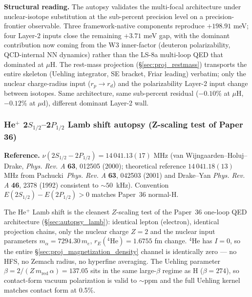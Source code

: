 \documentclass[11pt]{article}
\begin{document}
\textbf{Structural reading.}  The autopsy validates the multi-focal
architecture under nuclear-isotope substitution at the sub-percent
precision level on a precision-frontier observable.  Three
framework-native components reproduce $+198.91$ meV; four Layer-2
inputs close the remaining $+3.71$ meV gap, with the dominant
contribution now coming from the W3 inner-factor (deuteron
polarizability, QCD-internal NN dynamics) rather than the LS-8a
multi-loop QED that dominated at $\mu$H.  The rest-mass projection
(\S\ref{sec:proj_restmass}) transports the entire skeleton (Uehling
integrator, SE bracket, Friar leading) verbatim; only the nuclear
charge-radius input ($r_p \to r_d$) and the polarizability
Layer-2 input change between isotopes.  Same architecture, same
sub-percent residual ($-0.10\%$ at $\mu$H, $-0.12\%$ at $\mu$d),
different dominant Layer-2 wall.

\subsubsection{He$^+$ 2$S_{1/2}$--2$P_{1/2}$ Lamb shift autopsy (Z-scaling test of Paper 36)}
\label{sec:autopsy_he_plus_lamb}

\textbf{Reference.}  $\nu(2S_{1/2} - 2P_{1/2}) = 14\,041.13(17)$ MHz
(van Wijngaarden--Holuj--Drake, \emph{Phys. Rev. A} \textbf{63}, 012505
(2000); theoretical reference $14\,041.18(13)$ MHz from
Pachucki~\emph{Phys. Rev. A} \textbf{63}, 042503 (2001) and Drake--Yan
\emph{Phys. Rev. A} \textbf{46}, 2378 (1992) consistent to $\sim 50$~kHz).
Convention $E(2S_{1/2}) - E(2P_{1/2}) > 0$ matches Paper~36 normal-H.

The He$^+$ Lamb shift is the cleanest $Z$-scaling test of the Paper~36
one-loop QED architecture (\S\ref{sec:autopsy_lamb}): identical lepton
(electron), identical projection chains, only the nuclear charge $Z=2$
and the nuclear input parameters $m_\alpha = 7294.30\,m_e$, $r_E({}^4\text{He})
= 1.6755$ fm change.  ${}^4$He has $I=0$, so the entire
\S\ref{sec:proj_magnetization_density} channel is identically zero ---
no HFS, no Zemach radius, no hyperfine averaging.  The Uehling parameter
$\beta = 2/(Z\,m_{\text{red}}\,\alpha) = 137.05$ sits in the same large-$\beta$
regime as H ($\beta = 274$), so contact-form vacuum polarization is valid
to $\sim$ppm and the full Uehling kernel matches contact form at 0.5\%.
\end{document}
